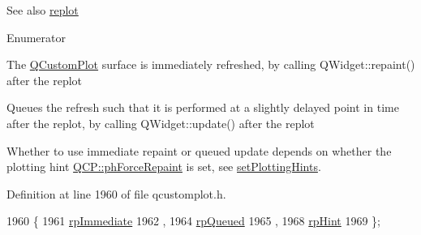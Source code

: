 \begin{DoxySeeAlso}{See also}
\hyperlink{class_q_custom_plot_a606fd384b2a637ce2c24899bcbde77d6}{replot} 
\end{DoxySeeAlso}
\begin{Desc}
\item[Enumerator]\par
\begin{description}
\item[{\em 
\hypertarget{class_q_custom_plot_a45d61392d13042e712a956d27762aa39a0d4831572370d871f2b7cb88806bac59}{}rp\+Immediate\label{class_q_custom_plot_a45d61392d13042e712a956d27762aa39a0d4831572370d871f2b7cb88806bac59}
}]The \hyperlink{class_q_custom_plot}{Q\+Custom\+Plot} surface is immediately refreshed, by calling Q\+Widget\+::repaint() after the replot \item[{\em 
\hypertarget{class_q_custom_plot_a45d61392d13042e712a956d27762aa39aaaae083a19bc668597bf0f86e000f798}{}rp\+Queued\label{class_q_custom_plot_a45d61392d13042e712a956d27762aa39aaaae083a19bc668597bf0f86e000f798}
}]Queues the refresh such that it is performed at a slightly delayed point in time after the replot, by calling Q\+Widget\+::update() after the replot \item[{\em 
\hypertarget{class_q_custom_plot_a45d61392d13042e712a956d27762aa39adfa1f2387617168d9299f4c8ad15b332}{}rp\+Hint\label{class_q_custom_plot_a45d61392d13042e712a956d27762aa39adfa1f2387617168d9299f4c8ad15b332}
}]Whether to use immediate repaint or queued update depends on whether the plotting hint \hyperlink{namespace_q_c_p_a5400e5fcb9528d92002ddb938c1f4ef4aa3090dafa0e0f9a28c579c79d6c2d283}{Q\+C\+P\+::ph\+Force\+Repaint} is set, see \hyperlink{class_q_custom_plot_a94a33cbdadbbac5934843508bcfc210d}{set\+Plotting\+Hints}. \end{description}
\end{Desc}


Definition at line 1960 of file qcustomplot.\+h.


\begin{DoxyCode}
1960                        \{
1961     \hyperlink{class_q_custom_plot_a45d61392d13042e712a956d27762aa39a0d4831572370d871f2b7cb88806bac59}{rpImmediate} 
1962     ,
1964     \hyperlink{class_q_custom_plot_a45d61392d13042e712a956d27762aa39aaaae083a19bc668597bf0f86e000f798}{rpQueued} 
1965     ,
1968     \hyperlink{class_q_custom_plot_a45d61392d13042e712a956d27762aa39adfa1f2387617168d9299f4c8ad15b332}{rpHint} 
1969   \};
\end{DoxyCode}


